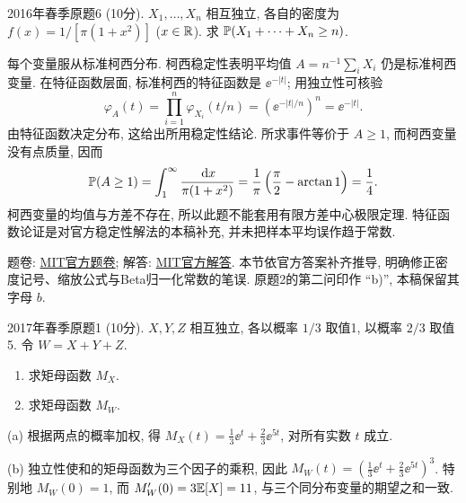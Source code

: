 \begin{exercise}\label{m2:2016s:q6}\label{m2:2016s:q6:whole}
2016年春季原题6 (10分). $X_1,\ldots,X_n$ 相互独立, 各自的密度为 $f(x)=1/[\pi(1+x^2)]$ ($x\in\mathbb R$). 求 $\mathbb P(X_1+\cdots+X_n\ge n)$.
\end{exercise}
\begin{solution}
每个变量服从标准柯西分布. 柯西稳定性表明平均值 $A=n^{-1}\sum_iX_i$ 仍是标准柯西变量. 在特征函数层面, 标准柯西的特征函数是 $\ee^{-|t|}$; 用独立性可核验
\[
\varphi_A(t)=\prod_{i=1}^n\varphi_{X_i}(t/n)=(\ee^{-|t|/n})^n=\ee^{-|t|}.
\]
由特征函数决定分布, 这给出所用稳定性结论. 所求事件等价于 $A\ge1$, 而柯西变量没有点质量, 因而
\[
\mathbb P(A\ge1)=\int_1^\infty\frac{\,\mathrm d x}{\pi(1+x^2)}=\frac1\pi\left(\frac\pi2-\arctan1\right)=\frac14.
\]
柯西变量的均值与方差不存在, 所以此题不能套用有限方差中心极限定理. 特征函数论证是对官方稳定性解法的本稿补充, 并未把样本平均误作趋于常数.
\end{solution}

题卷: \href{https://ocw.mit.edu/courses/18-600-probability-and-random-variables-fall-2019/resources/mit18_600f19_mid2_2017/}{MIT官方题卷}; 解答: \href{https://ocw.mit.edu/courses/18-600-probability-and-random-variables-fall-2019/resources/mit18_600f19_mid2_2017_soln/}{MIT官方解答}. 本节依官方答案补齐推导, 明确修正密度记号、缩放公式与Beta归一化常数的笔误. 原题2的第二问印作 ``b)'', 本稿保留其字母 $b$.

\begin{exercise}\label{m2:2017s:q1}
2017年春季原题1 (10分). $X,Y,Z$ 相互独立, 各以概率 $1/3$ 取值1, 以概率 $2/3$ 取值5. 令 $W=X+Y+Z$.
\begin{enumerate}
\item[(a)]\label{m2:2017s:q1:a} 求矩母函数 $M_X$.
\item[(b)]\label{m2:2017s:q1:b} 求矩母函数 $M_W$.
\end{enumerate}
\end{exercise}
\begin{solution}
(a) 根据两点的概率加权, 得 $M_X(t)=\frac13\ee^t+\frac23\ee^{5t}$, 对所有实数 $t$ 成立.

(b) 独立性使和的矩母函数为三个因子的乘积, 因此 $M_W(t)=(\frac13\ee^t+\frac23\ee^{5t})^3$. 特别地 $M_W(0)=1$, 而 $M_W'(0)=3\mathbb E[X]=11$, 与三个同分布变量的期望之和一致.
\end{solution}

